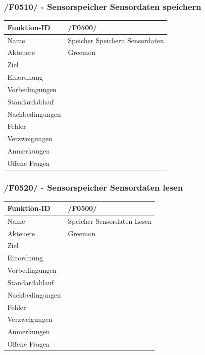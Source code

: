 \documentclass[pointlessnumbers]{scrartcl}
\begin{document}
 \subsubsection{/F0510/ - Sensorspeicher Sensordaten speichern}
 \begin{tabular}{|p{\BreiteErsterTab}|p{\BreiteZweiterTab}|}\hline
    Funktion-ID &       /F0500/  
                        \\ \hline
    Name &              Speicher Speichern Sensordaten
                        \\ \hline
    Akteuere &          Greemon
                        \\ \hline
    Ziel &             
                        \\ \hline
    Einordnung &        
                        \\ \hline
    Vorbedingungen &    
                        \\ \hline
    Standardablauf &    
                        \\ \hline
    Nachbedingungen &   
                        \\ \hline
    Fehler &       
                        \\ \hline
    Verzweigungen &     
                        \\ \hline
    Anmerkungen &       
                        \\ \hline
    Offene Fragen &     
                        \\ \hline
 \end{tabular} 
 
 \subsubsection{/F0520/ - Sensorspeicher Sensordaten lesen }
 \begin{tabular}{|p{\BreiteErsterTab}|p{\BreiteZweiterTab}|}\hline
    Funktion-ID &       /F0500/  
                        \\ \hline
    Name &              Speicher Sensordaten Lesen
                        \\ \hline
    Akteuere &          Greemon
                        \\ \hline
    Ziel &             
                        \\ \hline
    Einordnung &        
                        \\ \hline
    Vorbedingungen &    
                        \\ \hline
    Standardablauf &    
                        \\ \hline
    Nachbedingungen &   
                        \\ \hline
    Fehler &       
                        \\ \hline
    Verzweigungen &     
                        \\ \hline
    Anmerkungen &       
                        \\ \hline
    Offene Fragen &     
                        \\ \hline
 \end{tabular} 
\end{document}
